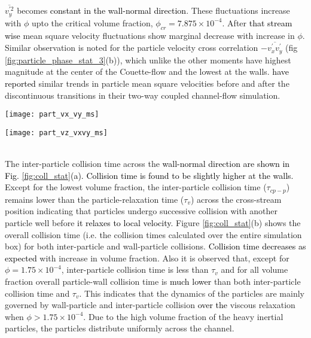 \documentclass[notitlepage]{revtex4-1}
\begin{document}
 $\overline{v_y^{\prime 2}}$ becomes \textcolor{black}{constant in the wall-normal direction}. These fluctuations increase with $\phi$ upto the critical volume fraction, $\phi_{cr}=7.875\times10^{-4}$. After \textcolor{black}{that stream wise} mean square velocity fluctuations show marginal decrease with increase in $\phi$. Similar observation is noted for the particle velocity cross correlation $-\overline{v_x^{\prime}v_y^{\prime}}$ (fig \ref{fig:particle_phase_stat_3}(b)), which unlike the other moments have highest magnitude at the center of the Couette-flow and the lowest at the walls. \textcolor{black}{\citet{muramulla2020disruption} have reported} similar trends in particle mean square velocities before and after the discontinuous transitions in their two-way coupled channel-flow simulation.
		\begin{figure*}[!]
			\texttt{[image: part\_vx\_vy\_ms]}
			\caption{Effect of particle volume fraction on (a) streamwise and (b) cross-stream mean square velocity of the particle phase}
			\label{fig:particle_phase_stat_2} 
		\end{figure*} 
		\begin{figure*}[!]
			\texttt{[image: part\_vz\_vxvy\_ms]}
			\caption{Effect of particle volume fraction on (a) span-wise mean square velocity, (b) streamwise and cross-stream velocity cross-correlation of the particle phase} 
			\label{fig:particle_phase_stat_3}
		\end{figure*}
\\ The inter-particle collision time across the \textcolor{black}{wall-normal direction are shown in Fig. \ref{fig:coll_stat}(a). Collision time is found to be slightly higher at the walls.} Except for the lowest volume fraction, the inter-particle collision time ($\tau_{cp-p}$) remains lower than the particle-relaxation time ($\tau_v$) across the cross-stream position indicating that particles undergo successive collision with another particle well before \textcolor{black}{it relaxes to local velocity}. Figure \ref{fig:coll_stat}(b)  shows  the overall collision time (i.e. the collision times calculated over the entire simulation box) for both inter-particle and wall-particle collisions. \textcolor{black}{Collision time decreases as expected} with increase in volume fraction. Also it is observed that, except for $\phi=1.75\times10^{-4}$, inter-particle collision time is less than $\tau_v$ and for all volume fraction overall particle-wall collision time is \textcolor{black}{much lower} than both inter-particle collision time and $\tau_v$. This indicates that the dynamics of the particles are mainly governed by wall-particle and inter-particle collision \textcolor{black}{over the} viscous relaxation when $\phi>1.75\times10^{-4}$. Due to the high volume fraction of the heavy inertial particles, the particles distribute uniformly across the channel. 
\end{document}
